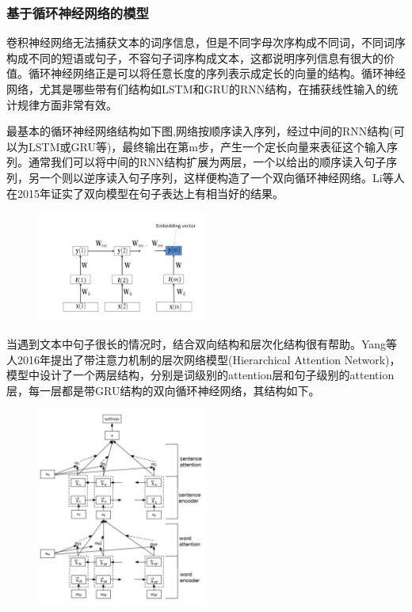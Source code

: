\documentclass[UTF8]{ctexart}
\begin{document}
\subsubsection{基于循环神经网络的模型}
	卷积神经网络无法捕获文本的词序信息，但是不同字母次序构成不同词，不同词序构成不同的短语或句子，不容句子词序构成文本，这都说明序列信息有很大的价值。循环神经网络正是可以将任意长度的序列表示成定长的向量的结构。循环神经网络，尤其是哪些带有们结构如LSTM和GRU的RNN结构，在捕获线性输入的统计规律方面非常有效。
	\par 最基本的循环神经网络结构如下图,网络按顺序读入序列，经过中间的RNN结构(可以为LSTM或GRU等)，最终输出在第m步，产生一个定长向量来表征这个输入序列。通常我们可以将中间的RNN结构扩展为两层，一个以给出的顺序读入句子序列，另一个则以逆序读入句子序列，这样便构造了一个双向循环神经网络。Li等人在2015年证实了双向模型在句子表达上有相当好的结果。
	\begin{figure}[H]
		\centering \includegraphics[width=0.5\textwidth]{BasicRNN}
	\end{figure}
	\par 当遇到文本中句子很长的情况时，结合双向结构和层次化结构很有帮助。Yang等人2016年提出了带注意力机制的层次网络模型(Hierarchical Attention Network)，模型中设计了一个两层结构，分别是词级别的attention层和句子级别的attention层，每一层都是带GRU结构的双向循环神经网络，其结构如下。
	\begin{figure}[H]
		\centering \includegraphics[width=0.5\textwidth]{AHN}
	\end{figure}
\end{document}

